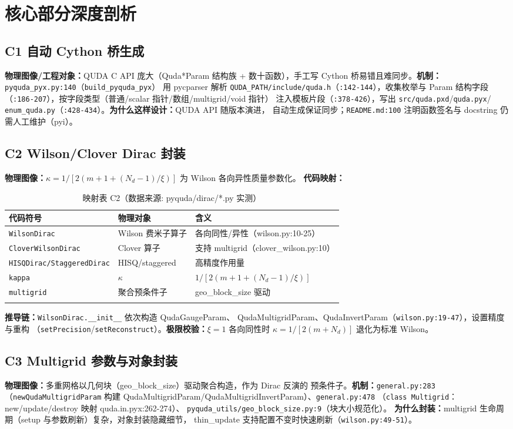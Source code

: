\documentclass[UTF8]{ctexart}
\begin{document}
\section{核心部分深度剖析}

\subsection{C1 自动 Cython 桥生成}
\textbf{物理图像/工程对象：}QUDA C API 庞大（Quda*Param 结构族 + 数十函数），手工写
Cython 桥易错且难同步。\textbf{机制：}\texttt{pyquda\_pyx.py:140}（\texttt{build\_pyquda\_pyx}）
用 pycparser 解析 \texttt{QUDA\_PATH/include/quda.h}（\texttt{:142-144}），收集枚举与
Param 结构字段（\texttt{:186-207}），按字段类型（普通/scalar 指针/数组/multigrid/void 指针）
注入模板片段（\texttt{:378-426}），写出 \texttt{src/quda.pxd}/\texttt{quda.pyx}/
\texttt{enum\_quda.py}（\texttt{:428-434}）。\textbf{为什么这样设计：}QUDA API 随版本演进，
自动生成保证同步；\texttt{README.md:100} 注明函数签名与 docstring 仍需人工维护（pyi）。

\subsection{C2 Wilson/Clover Dirac 封装}
\textbf{物理图像：}$\kappa = 1/[2(m+1+(N_d-1)/\xi)]$ 为 Wilson 各向异性质量参数化。
\textbf{代码映射：}
\begin{xltabular}{\textwidth}{lXX}
\toprule
\textcolor{map}{代码符号} & 物理对象 & 含义 \\
\midrule
\endhead
\texttt{WilsonDirac} & Wilson 费米子算子 & 各向同性/异性（wilson.py:10-25）\\
\texttt{CloverWilsonDirac} & Clover 算子 & 支持 multigrid（clover\_wilson.py:10）\\
\texttt{HISQDirac/StaggeredDirac} & HISQ/staggered & 高精度作用量 \\
\texttt{kappa} & $\kappa$ & $1/[2(m+1+(N_d-1)/\xi)]$\\
\texttt{multigrid} & 聚合预条件子 & geo\_block\_size 驱动 \\
\bottomrule
\caption{映射表 C2（数据来源: pyquda/dirac/*.py 实测）}
\end{xltabular}
\textbf{推导链：}\texttt{WilsonDirac.\_\_init\_\_} 依次构造 QudaGaugeParam、
QudaMultigridParam、QudaInvertParam（\texttt{wilson.py:19-47}），设置精度与重构
（\texttt{setPrecision}/\texttt{setReconstruct}）。\textbf{极限校验：}$\xi=1$ 各向同性时
$\kappa=1/[2(m+N_d)]$ 退化为标准 Wilson。

\subsection{C3 Multigrid 参数与对象封装}
\textbf{物理图像：}多重网格以几何块（geo\_block\_size）驱动聚合构造，作为 Dirac 反演的
预条件子。\textbf{机制：}\texttt{general.py:283}（\texttt{newQudaMultigridParam} 构建
QudaMultigridParam/QudaMultigridInvertParam）、\texttt{general.py:478}
（\texttt{class Multigrid}：new/update/destroy 映射 quda.in.pyx:262-274）、
\texttt{pyquda\_utils/geo\_block\_size.py:9}（块大小规范化）。
\textbf{为什么封装：}multigrid 生命周期（setup 与参数刷新）复杂，对象封装隐藏细节，
thin\_update 支持配置不变时快速刷新（\texttt{wilson.py:49-51}）。
\end{document}

